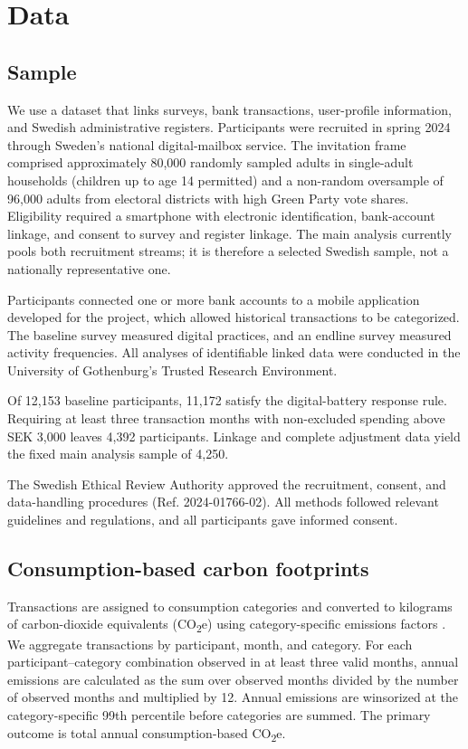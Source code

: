 \documentclass[11pt,a4paper]{article}
\begin{document}
\section{Data}

\subsection{Sample}
We use a dataset that links surveys, bank transactions, user-profile
information, and Swedish administrative registers. Participants were recruited
in spring 2024 through Sweden's national digital-mailbox service. The invitation
frame comprised approximately 80,000 randomly sampled adults in single-adult
households (children up to age 14 permitted) and a non-random oversample of
96,000 adults from electoral districts with high Green Party
vote shares. Eligibility required a smartphone with electronic identification,
bank-account linkage, and consent to survey and register linkage. The main
analysis currently pools both recruitment streams; it is therefore a selected
Swedish sample, not a nationally representative one.

Participants connected one or more bank accounts to a mobile application developed for the project, which
allowed historical transactions to be categorized. The baseline survey measured digital practices, and an endline survey measured activity
frequencies. All analyses of identifiable linked data were conducted in the
University of Gothenburg's Trusted Research Environment.

Of 12,153 baseline participants, 11,172 satisfy the digital-battery response
rule. Requiring at least three transaction months with non-excluded spending
above SEK 3,000 leaves 4,392 participants. Linkage and complete adjustment data
yield the fixed main analysis sample of 4,250.

The Swedish Ethical Review Authority approved the recruitment, consent, and
data-handling procedures (Ref. 2024-01766-02). All methods followed relevant
guidelines and regulations, and all participants gave informed consent.

\subsection{Consumption-based carbon footprints}
Transactions are assigned to consumption categories and converted to kilograms of carbon-dioxide
equivalents (CO\textsubscript{2}e) using category-specific emissions factors \citep{andersson2020,andersson2023}.
We aggregate transactions by participant, month, and category. For each
participant--category combination observed in at least three valid months,
annual emissions are calculated as the sum over observed months divided by the
number of observed months and multiplied by 12. Annual emissions are winsorized
at the category-specific 99th percentile before categories are summed. The
primary outcome is total annual consumption-based CO\textsubscript{2}e.
\end{document}

